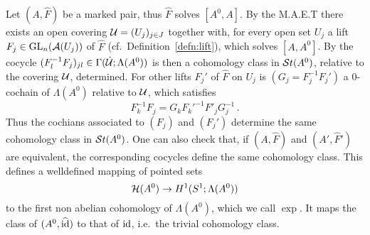 Let $(A,\hat F)$ be a marked pair, thus $\hat F$ solves $[A^0,A]$.
By the M.A.E.T there exists an open covering $\mathcal{U}=(U_j)_{j\in J}$ together
with, for every open set $U_j$ a lift $F_j\in\operatorname{GL}_n(\mathcal{A}(U_j))$ of $\hat F$
(cf.\ Definition~\ref{defn:lift}), which solves $[A,A^0]$.
By the cocycle $(F_l^{-1}F_j)_{jl}\in\Gamma(\dot{\mathcal{U}};\Lambda(A^0))$ is then a
cohomology class in $\mathcal{S}{}t(A^0)$, relative to the covering $\mathcal{U}$, determined.
For other lifts $F_j'$ of $\hat F$ on $U_j$ is $(G_j=F_j^{-1}F_j')$ a
$0$-cochain of $\Lambda(A^0)$ relative to $\mathcal{U}$, which satisfies
\[
  F_k^{-1}F_j=G_k F_k'^{-1}F'_j G_j^{-1} \,.
\]
Thus the cochians associated to $(F_j)$ and $(F_j')$ determine the same
cohomology class in $\mathcal{S}{}t(A^0)$.
One can also check that, if $(A,\hat F)$ and $(A',\hat F')$ are equivalent, the
corresponding cocycles define the same cohomology class.
This defines a welldefined mapping of pointed sets
\[
  \mathcal{H}(A^0)\to H^1(S^1;\Lambda(A^0))
\]
to the first non abelian cohomology of $\Lambda(A^0)$, which we call $\exp$.
It maps the class of $(A^0,\widehat{\operatorname{id}})$ to that of $\operatorname{id}$, i.e.\ the trivial
cohomology class.


